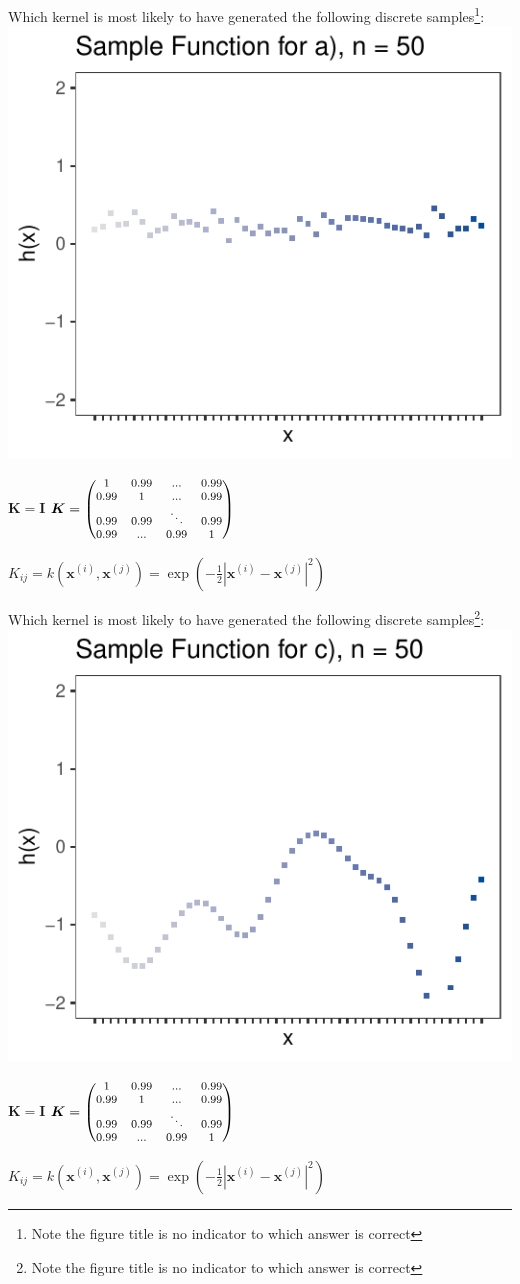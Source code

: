 \documentclass{exam}
\newcommand{\xI}[1]{\mathbf{x}^{(#1)}}
\begin{document}
\begin{questions}
		\question Which kernel is most likely to have generated the following discrete samples\footnote{Note the figure title is no indicator to which answer is correct}:\\
		\includegraphics[width=.22\textwidth]{w05_gps/figure_man/discrete/example_extreme_50-1.pdf}
		\begin{choices}
			\choice $\bm{K} = \boldsymbol{I}$
			\choice $\bm{K} = \begin{footnotesize}\begin{pmatrix} 1 & 0.99 & ... & 0.99 \\
			0.99 & 1 & ... & 0.99 \\
			0.99 & 0.99 & \ddots & 0.99 \\
			0.99 & ... & 0.99 & 1 \end{pmatrix}\end{footnotesize}$ %
			\choice \begin{footnotesize}$K_{ij} = k(\xI{i}, \xI{j}) = \exp\left(-\frac{1}{2}\left|\xI{i} - \xI{j}\right|^2\right)$\end{footnotesize}
		\end{choices}
		
		\question Which kernel is most likely to have generated the following discrete samples\footnote{Note the figure title is no indicator to which answer is correct}:\\
		\includegraphics[width=.22\textwidth]{w05_gps/figure_man/discrete/example_extreme_50-3.pdf}
		\begin{choices}
			\choice $\bm{K} = \boldsymbol{I}$
			\choice $\bm{K} = \begin{footnotesize}\begin{pmatrix} 1 & 0.99 & ... & 0.99 \\
			0.99 & 1 & ... & 0.99 \\
			0.99 & 0.99 & \ddots & 0.99 \\
			0.99 & ... & 0.99 & 1 \end{pmatrix}\end{footnotesize}$
			\choice \begin{footnotesize}$K_{ij} = k(\xI{i}, \xI{j}) = \exp\left(-\frac{1}{2}\left|\xI{i} - \xI{j}\right|^2\right)$\end{footnotesize} %
		\end{choices}
		

\end{questions}
\end{document}
